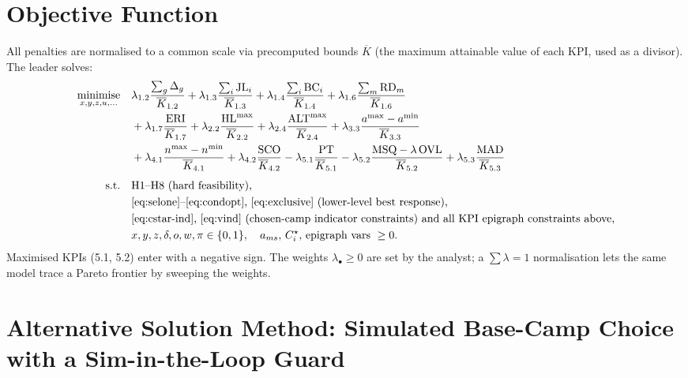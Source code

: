 \documentclass[12pt, letterpaper]{article}
\DeclareMathOperator*{\minimise}{minimise}
\begin{document}
\section{Objective Function}

All penalties are normalised to a common scale via precomputed bounds
$\overline{K}$ (the maximum attainable value of each KPI, used as a
divisor). The leader solves:
\begin{align}
\minimise_{x,y,z,u,\dots}\quad
& \lambda_{1.2}\frac{\sum_g\Delta_g}{\overline{K}_{1.2}}
+ \lambda_{1.3}\frac{\sum_i\mathrm{JL}_i}{\overline{K}_{1.3}}
+ \lambda_{1.4}\frac{\sum_i\mathrm{BC}_i}{\overline{K}_{1.4}}
+ \lambda_{1.6}\frac{\sum_m\mathrm{RD}_m}{\overline{K}_{1.6}}
\notag\\
& + \lambda_{1.7}\frac{\mathrm{ERI}}{\overline{K}_{1.7}}
+ \lambda_{2.2}\frac{\mathrm{HL}^{\max}}{\overline{K}_{2.2}}
+ \lambda_{2.4}\frac{\mathrm{ALT}^{\max}}{\overline{K}_{2.4}}
+ \lambda_{3.3}\frac{a^{\max}-a^{\min}}{\overline{K}_{3.3}}
\notag\\
& + \lambda_{4.1}\frac{n^{\max}-n^{\min}}{\overline{K}_{4.1}}
+ \lambda_{4.2}\frac{\mathrm{SCO}}{\overline{K}_{4.2}}
- \lambda_{5.1}\frac{\mathrm{PT}}{\overline{K}_{5.1}}
- \lambda_{5.2}\frac{\mathrm{MSQ}-\lambda\,\mathrm{OVL}}{\overline{K}_{5.2}}
+ \lambda_{5.3}\frac{\mathrm{MAD}}{\overline{K}_{5.3}}
\\[4pt]
\text{s.t.}\quad
& \text{H1--H8 (hard feasibility),}\notag\\
& \text{\eqref{eq:selone}--\eqref{eq:condopt}, \eqref{eq:exclusive} (lower-level best response),}
  \notag\\
& \text{\eqref{eq:cstar-ind}, \eqref{eq:vind} (chosen-camp indicator
  constraints) and all KPI epigraph constraints above,}\notag\\
& x,y,z,\delta,o,w,\pi\in\{0,1\},\quad
  a_{ms},\,C_i^\star,\,\text{epigraph vars}\ \ge 0.
\notag
\end{align}
Maximised KPIs (5.1, 5.2) enter with a negative sign. The weights
$\lambda_\bullet\ge0$ are set by the analyst; a $\sum\lambda=1$
normalisation lets the same model trace a Pareto frontier by sweeping the
weights.

\section{Alternative Solution Method: Simulated Base-Camp Choice
with a Sim-in-the-Loop Guard}
\label{sec:simloop}
\end{document}
